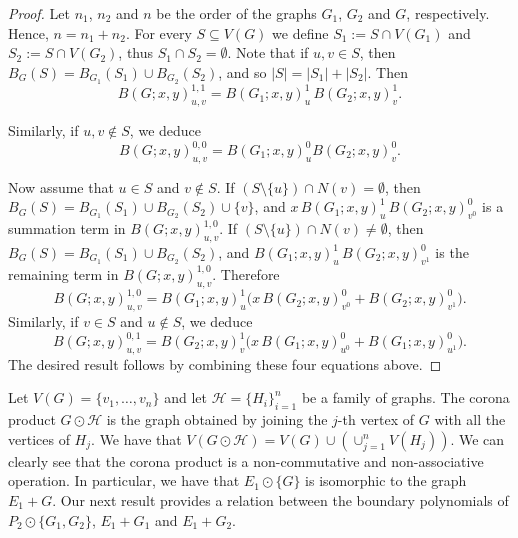 \documentclass[review]{elsarticle}
\begin{document}
\begin{proof}
Let $n_1$, $n_2$ and $n$ be the order of the graphs $G_1$, $G_2$ and $G$, respectively. Hence, $n=n_1+n_2$. For every $S \subseteq V(G)$ we define
$S_{1} := S \cap V(G_1)$ and $S_{2} := S \cap V(G_2)$, thus $S_1\cap S_2=\emptyset$. Note that if $u,v \in S$, then $B_{G}(S)= B_{G_{1}}(S_{1}) \cup B_{G_{2}}(S_{2})$, and so
$|S|= |S_{1}| + |S_{2}|$. Then
\begin{equation}
\nonumber
B(G;x,y)^{1,1}_{u,v} = B(G_{1};x,y)^{1}_{u}\,B(G_{2};x,y)^{1}_{v}.
\end{equation}

Similarly,  if $u,v \notin S$, we deduce
\begin{equation}
\nonumber
B(G;x,y)^{0,0}_{u,v} = B(G_{1};x,y)^{0}_{u}B(G_{2};x,y)^{0}_{v}.
\end{equation}

Now assume that $u \in S$ and $v \notin S$. If $(S\setminus\{u\})\cap N(v)=\emptyset$,  then
$B_{G}(S)= B_{G_{1}}(S_{1}) \cup B_{G_{2}}(S_{2}) \cup \{v\}$, and  $x\,B(G_{1};x,y)^{1}_{u}\,B(G_{2};x,y)^{0}_{v^{0}}$ is a summation term in $B(G;x,y)^{1,0}_{u,v}$.
If $(S\setminus\{u\})\cap N(v)\neq \emptyset$, then $B_{G}(S)= B_{G_{1}}(S_{1}) \cup B_{G_{2}}(S_{2})$, and 
$B(G_{1};x,y)^{1}_{u}\,B(G_{2};x,y)^{0}_{v^{1}}$ is the remaining term in $B(G;x,y)^{1,0}_{u,v}$. Therefore
\begin{equation}
\nonumber
B(G;x,y)^{1,0}_{u,v} = B(G_{1};x,y)^{1}_{u}\Big(x\,B(G_{2};x,y)^{0}_{v^{0}}
+ B(G_{2};x,y)^{0}_{v^{1}}\Big).
\end{equation}
Similarly, if  $v \in S$ and $u \notin S$, we deduce
\begin{equation}
\nonumber
B(G;x,y)^{0,1}_{u,v} = B(G_{2};x,y)^{1}_{v} \Big(x\,B(G_{1};x,y)^{0}_{u^{0}}
+ B(G_{1};x,y)^{0}_{u^{1}}\Big).
\end{equation}
The desired result follows by combining these four equations above.
\end{proof}



Let $V(G) = \{v_{1},\ldots,v_{n}\}$ and let $\mathcal H = \{H_{i}\}_{i=1}^{n}$ be a family of graphs. The corona product $G \odot \mathcal H$ is the graph obtained by joining the $j$-th vertex of $G$ with all the vertices of $H_{j}$. We have that $V(G \odot \mathcal H) = V(G)\cup\left(\cup_{j=1}^{n}V(H_{j})\right)$. We can clearly see that the corona product is a non-commutative and non-associative operation. In particular, we have that $E_{1} \odot \{G\}$ is isomorphic to the graph $E_{1} + G$. Our next result provides a relation between the boundary polynomials of $P_2\odot\{G_1,G_2\}$, $E_1+G_1$ and $E_1+G_2$.
\end{document}
